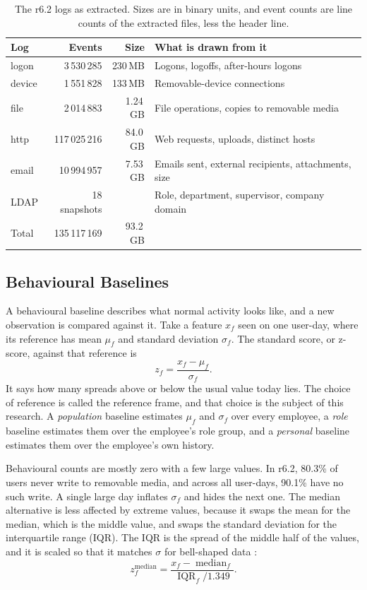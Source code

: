 \documentclass[a4paper,12pt]{article}
\begin{document}
\begin{table}[htbp]
\centering
\caption{The r6.2 logs as extracted. Sizes are in binary units, and event counts are line counts of the extracted files, less the header line.}
\label{tab:logs}
\small
\begin{tabular}{@{}l r r p{5.6cm}@{}}
\toprule
\textbf{Log} & \textbf{Events} & \textbf{Size} & \textbf{What is drawn from it} \\
\midrule
logon  & 3\,530\,285   & 230\,MB  & Logons, logoffs, after-hours logons \\
device & 1\,551\,828   & 133\,MB  & Removable-device connections \\
file   & 2\,014\,883   & 1.24\,GB & File operations, copies to removable media \\
http   & 117\,025\,216 & 84.0\,GB & Web requests, uploads, distinct hosts \\
email  & 10\,994\,957  & 7.53\,GB & Emails sent, external recipients, attachments, size \\
LDAP   & 18 snapshots  &          & Role, department, supervisor, company domain \\
\midrule
Total  & 135\,117\,169 & 93.2\,GB & \\
\bottomrule
\end{tabular}
\end{table}

\subsection{Behavioural Baselines}
A behavioural baseline describes what normal activity looks like, and a new observation is compared against it. Take a feature $x_f$ seen on one user-day, where its reference has mean $\mu_f$ and standard deviation $\sigma_f$. The standard score, or z-score, against that reference is
\[
   z_f = \frac{x_f - \mu_f}{\sigma_f}.
\]
It says how many spreads above or below the usual value today lies. The choice of reference is called the reference frame, and that choice is the subject of this research. A \emph{population} baseline estimates $\mu_f$ and $\sigma_f$ over every employee, a \emph{role} baseline estimates them over the employee's role group, and a \emph{personal} baseline estimates them over the employee's own history.

Behavioural counts are mostly zero with a few large values. In r6.2, 80.3\% of users never write to removable media, and across all user-days, 90.1\% have no such write. A single large day inflates $\sigma_f$ and hides the next one. The median alternative is less affected by extreme values, because it swaps the mean for the median, which is the middle value, and swaps the standard deviation for the interquartile range (IQR). The IQR is the spread of the middle half of the values, and it is scaled so that it matches $\sigma$ for bell-shaped data \cite{Rousseeuw2011}:
\[
   z^{\text{median}}_f = \frac{x_f - \operatorname{median}_f}{\operatorname{IQR}_f / 1.349}.
\]
\end{document}
